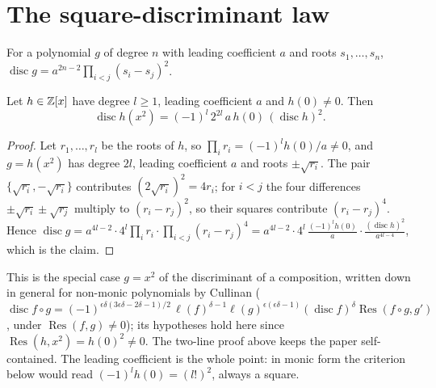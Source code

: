 \documentclass[11pt]{article}
\DeclareMathOperator{\disc}{disc}
\DeclareMathOperator{\Res}{Res}
\begin{document}
\section{The square-discriminant law}\label{sec:law}

For a polynomial $g$ of degree $n$ with leading coefficient $a$ and roots $s_1,\dots,s_n$, $\disc g=a^{2n-2}\prod_{i<j}(s_i-s_j)^2$.

\begin{lemma}\label{lem:comp}
Let $h\in\mathbb{Z}[x]$ have degree $l\ge1$, leading coefficient $a$ and $h(0)\ne0$. Then
\[
\disc h(x^2)=(-1)^l\,2^{2l}\,a\,h(0)\,(\disc h)^2 .
\]
\end{lemma}
\begin{proof}
Let $r_1,\dots,r_l$ be the roots of $h$, so $\prod_ir_i=(-1)^lh(0)/a\ne0$, and $g=h(x^2)$ has degree $2l$, leading coefficient $a$ and roots $\pm\sqrt{r_i}$. The pair $\{\sqrt{r_i},-\sqrt{r_i}\}$ contributes $(2\sqrt{r_i})^2=4r_i$; for $i<j$ the four differences $\pm\sqrt{r_i}\pm\sqrt{r_j}$ multiply to $(r_i-r_j)^2$, so their squares contribute $(r_i-r_j)^4$. Hence
$\disc g=a^{4l-2}\cdot4^l\prod_ir_i\cdot\prod_{i<j}(r_i-r_j)^4
=a^{4l-2}\cdot4^l\,\frac{(-1)^lh(0)}a\cdot\frac{(\disc h)^2}{a^{4l-4}}$,
which is the claim.
\end{proof}

This is the special case $g=x^2$ of the discriminant of a composition, written down in general for non-monic polynomials by Cullinan \cite{Cullinan} ($\disc f\circ g=(-1)^{\epsilon\delta(3\epsilon\delta-2\delta-1)/2}\,\ell(f)^{\delta-1}\ell(g)^{\epsilon(\epsilon\delta-1)}(\disc f)^\delta\Res(f\circ g,g')$, under $\Res(f,g)\ne0$); its hypotheses hold here since $\Res(h,x^2)=h(0)^2\ne0$. The two-line proof above keeps the paper self-contained. The leading coefficient is the whole point: in monic form the criterion below would read $(-1)^lh(0)=(l!)^2$, always a square.
\end{document}
